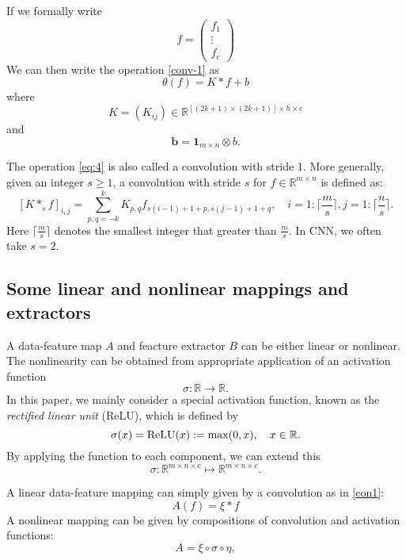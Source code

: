 If we formally write 
\begin{equation}
f=
\begin{pmatrix}
f_1\\
\vdots\\
f_c  
\end{pmatrix}
\end{equation}
We can then write the operation \eqref{conv-1} as
\begin{equation}
\label{eq:4}
\theta(f)=K\ast f+b
\end{equation}
where 
$$
K=(K_{ij})\in \mathbb R^{[(2k+1)\times(2k+1)]\times h\times c}
$$
and 
$$
\bm{b}=\bm{1}_{m\times n}\otimes b.
$$

The operation \eqref{eq:4} is also called a convolution with stride 1. More generally, 
given an integer $s\ge1$, a convolution with stride $s$ for $f \in \mathbb{R}^{m\times
	n}$ is defined as:
\begin{equation}\label{stride}
[K \ast_s f]_{i,j} = \sum_{p,q=-k}^k K_{p,q} f_{s(i-1)+1 + p, s(j-1)+1 + q},  
\quad i = 1: \lceil  \frac{m}{s}\rceil , j = 1: \lceil  \frac{n}{s}\rceil.
\end{equation}
Here $ \lceil  \frac{m}{s}\rceil$ denotes the smallest integer that greater than $\frac{m}{s}$.
In CNN, we often take $s=2$.


\subsection{Some linear and nonlinear mappings and extractors}
A data-feature map $A$ and feacture extractor $B$ can be either
linear or nonlinear.   The nonlinearity can be obtained from
appropriate application of an activation function
\begin{equation}
\label{act}
\sigma: \mathbb{R} \to \mathbb{R} .
\end{equation}
In this paper, we mainly consider a special activation function, known 
as the {\it rectified linear unit} (ReLU), which is defined by
\begin{equation}
\label{relu}
\sigma(x)= {\rm ReLU}(x) :=\max(0,x), \quad x\in\mathbb{R}. 
\end{equation}
By applying the function to each component, we can extend this
\begin{equation}
\label{vector-act}
\sigma:\mathbb R^{m\times n\times c}\mapsto \mathbb R^{m\times n\times c}.  
\end{equation}


A linear data-feature mapping can simply given by a convolution as in \eqref{con1}:
\begin{equation}
\label{linearA}
A(f)=\xi\ast f
\end{equation}
A nonlinear mapping can be given by compositions of convolution and
activation functions:
\begin{equation}
\label{nonlinearA}
A=\xi\circ\sigma\circ\eta ,
\end{equation}

